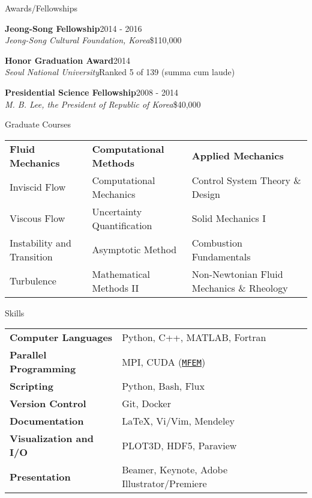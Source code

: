 \documentclass{resume} %
\begin{document}


\begin{rSection}{Awards/Fellowships}

{\bf Jeong-Song Fellowship}\hfill 2014 - 2016\\
{\it Jeong-Song Cultural Foundation, Korea}\hfill \$110,000

{\bf Honor Graduation Award}\hfill 2014\\
{\it Seoul National University}\hfill Ranked 5 of 139 (summa cum laude)

{\bf Presidential Science Fellowship}\hfill 2008 - 2014\\
{\it M. B. Lee, the President of Republic of Korea}\hfill \$40,000

\end{rSection}

\begin{rSection}{Graduate Courses}
\hspace{-.7cm}
\begin{tabular}{p{4.5cm}p{5cm}l}
\textbf{Fluid Mechanics} & \textbf{Computational Methods} & \textbf{Applied Mechanics}\\
Inviscid Flow & Computational Mechanics & Control System Theory \& Design \\
Viscous Flow & Uncertainty Quantification &  Solid Mechanics I \\
Instability and Transition & Asymptotic Method & Combustion Fundamentals \\
Turbulence & Mathematical Methods II & Non-Newtonian Fluid Mechanics \& Rheology
\end{tabular}

\end{rSection}


\begin{rSection}{Skills}

\begin{tabular}{ @{} >{\bfseries}l @{\hspace{6ex}} l }
Computer Languages &  Python, C++, MATLAB, Fortran\\
Parallel Programming & MPI, CUDA  (\href{https://mfem.org}{\texttt{MFEM}})\\
Scripting & Python, Bash, Flux \\
Version Control & Git, Docker \\
Documentation & \LaTeX, Vi/Vim, Mendeley \\
Visualization and I/O & PLOT3D, HDF5, Paraview \\
Presentation & Beamer, Keynote, Adobe Illustrator/Premiere \\
\end{tabular}

\end{rSection}
\end{document}
